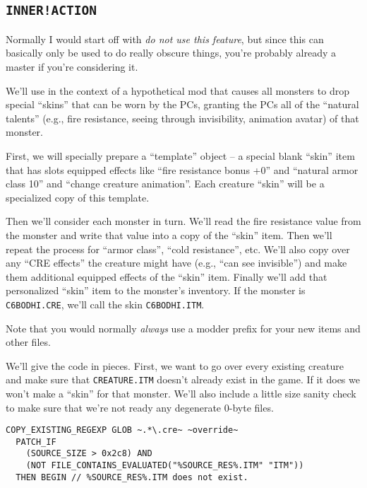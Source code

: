 \documentclass{article}
\def\ttref#1{\ahrefloc{#1}{\tt #1}}
\def\t#1{{\tt #1}}
\begin{document}
\label{sec-inner-action}\subsection{\tt{INNER!ACTION}}

Normally I would start off with \emph{do not use this feature}, but since
this \ttref{patch} can basically only be used to do really obscure things,
you're probably already a master if you're considering it.

We'll use \ttref{INNER!ACTION} in the context of a hypothetical mod
that causes all monsters to drop special ``skins'' that can be worn by the
PCs, granting the PCs all of the ``natural talents'' (e.g., fire
resistance, seeing through invisibility, animation avatar) of that monster.

First, we will specially prepare a ``template'' object -- a special blank
``skin'' item that has slots equipped effects like ``fire resistance bonus
+0'' and ``natural armor class 10'' and ``change creature animation''. Each
creature ``skin'' will be a specialized copy of this template.

Then we'll consider each monster in turn. We'll read the fire resistance
value from the monster and write that value into a copy of the ``skin''
item. Then we'll repeat the process for ``armor class'', ``cold
resistance'', etc.  We'll also copy over any ``CRE effects'' the creature
might have (e.g., ``can see invisible'') and make them additional equipped
effects of the ``skin'' item. Finally we'll add that personalized ``skin''
item to the monster's inventory. If the monster is \t{C6BODHI.CRE}, we'll
call the skin \t{C6BODHI.ITM}.

Note that you would normally \emph{always} use a modder prefix for your new
items and other files.

We'll give the code in pieces. First, we want to go over every existing
creature and make sure that \t{CREATURE.ITM} doesn't already exist in the
game. If it does we won't make a ``skin'' for that monster. We'll also
include a little size sanity check to make sure that we're not ready any
degenerate 0-byte files.

\begin{verbatim}
COPY_EXISTING_REGEXP GLOB ~.*\.cre~ ~override~
  PATCH_IF
    (SOURCE_SIZE > 0x2c8) AND
    (NOT FILE_CONTAINS_EVALUATED("%SOURCE_RES%.ITM" "ITM"))
  THEN BEGIN // %SOURCE_RES%.ITM does not exist.
\end{verbatim}
\end{document}
